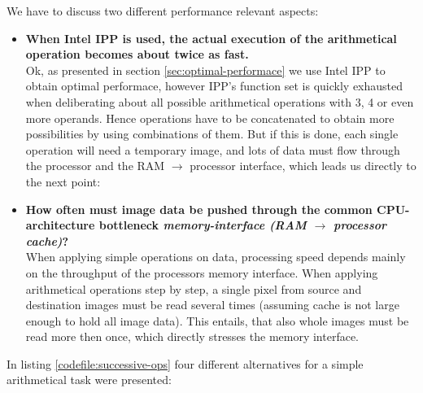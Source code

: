 
We have to discuss two different performance relevant aspects: 

\begin{itemize}
\item \textbf{When Intel IPP is used, the actual execution of the arithmetical operation becomes about twice as fast.}\\
Ok, as presented in section \ref{sec:optimal-performace} we use Intel IPP to obtain optimal performace, however  IPP's function set is quickly exhausted when deliberating  about all possible arithmetical operations with 3, 4 or even more operands. Hence operations have to be concatenated to obtain more possibilities by using combinations of them. But if this is done, each single operation will need a temporary image, and lots of data must flow through the processor and the RAM $\rightarrow$ processor interface, which leads us directly to the next point:
\item \textbf{How often must image data be pushed through the common CPU-architecture bottleneck \emph{memory-interface (RAM $\rightarrow$ processor cache)}?}\\
When applying simple operations on data, processing speed depends mainly on the throughput of the processors memory interface. When applying arithmetical operations step by step, a single pixel from source and destination images must be read several times (assuming cache is not large enough to hold all image data). This entails, that also whole images must be read more then once, which directly stresses the memory interface. 
\end{itemize}

In listing \ref{codefile:successive-ops} four different alternatives for a simple arithmetical task were presented:

